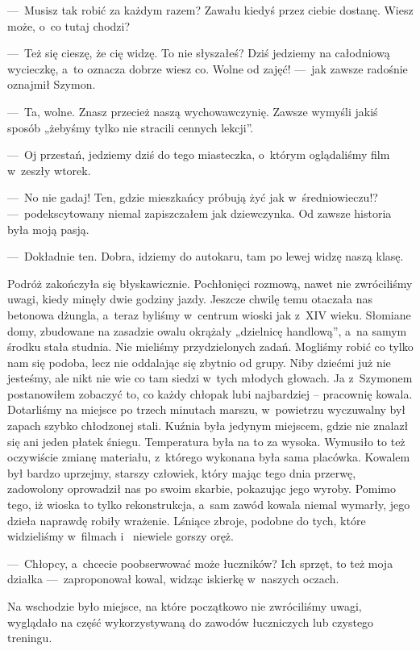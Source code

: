 ---~Musisz tak robić za każdym razem? Zawału kiedyś przez ciebie dostanę. Wiesz może, o~co tutaj chodzi?

---~Też się cieszę, że cię widzę. To nie słyszałeś? Dziś jedziemy na całodniową wycieczkę, a~to oznacza dobrze wiesz 
co. Wolne od zajęć! ---~jak zawsze radośnie oznajmił Szymon.

---~Ta, wolne. Znasz przecież naszą wychowawczynię. Zawsze wymyśli jakiś sposób „żebyśmy tylko nie stracili cennych 
lekcji”.

---~Oj przestań, jedziemy dziś do tego miasteczka, o~którym oglądaliśmy film w~zeszły wtorek.

---~No nie gadaj! Ten, gdzie mieszkańcy próbują żyć jak w~średniowieczu!? ---~podekscytowany niemal zapiszczałem jak 
dziewczynka. Od zawsze historia była moją pasją.

---~Dokładnie ten. Dobra, idziemy do autokaru, tam po lewej widzę naszą klasę.

Podróż zakończyła się błyskawicznie. Pochłonięci rozmową, nawet nie zwróciliśmy uwagi, kiedy minęły dwie godziny 
jazdy. Jeszcze chwilę temu otaczała nas betonowa dżungla, a~teraz byliśmy w~centrum wioski jak z~XIV wieku. Słomiane 
domy, zbudowane na zasadzie owalu okrążały „dzielnicę handlową”, a~na samym środku stała studnia. Nie mieliśmy 
przydzielonych zadań. Mogliśmy robić co tylko nam się podoba, lecz nie oddalając się zbytnio od grupy. Niby dziećmi 
już nie jesteśmy, ale nikt nie wie co tam siedzi w~tych młodych głowach. Ja z~Szymonem postanowiłem zobaczyć to, co 
każdy chłopak lubi najbardziej -- pracownię kowala. Dotarliśmy na miejsce po trzech minutach marszu, w~powietrzu 
wyczuwalny był zapach szybko chłodzonej stali. Kuźnia była jedynym miejscem, gdzie nie znalazł się ani jeden płatek 
śniegu. Temperatura była na to za wysoka. Wymusiło to też oczywiście zmianę materiału, z~którego wykonana była sama 
placówka. Kowalem był bardzo uprzejmy, starszy człowiek, który mając tego dnia przerwę, zadowolony oprowadził nas po 
swoim skarbie, pokazując jego wyroby. Pomimo tego, iż wioska to tylko rekonstrukcja, a~sam zawód kowala niemal 
wymarły, jego dzieła naprawdę robiły wrażenie. Lśniące zbroje, podobne do tych, które widzieliśmy w~filmach i~
niewiele gorszy oręż.

---~Chłopcy, a~chcecie poobserwować może łuczników? Ich sprzęt, to też moja działka ---~zaproponował kowal, widząc 
iskierkę w~naszych oczach.

Na wschodzie było miejsce, na które początkowo nie zwróciliśmy uwagi, wyglądało na część wykorzystywaną do zawodów 
łuczniczych lub czystego treningu.

